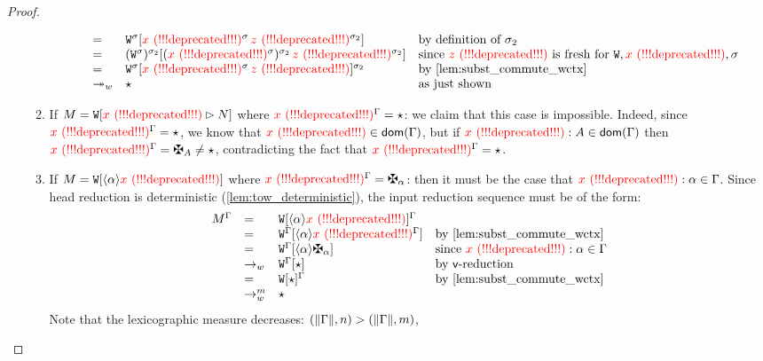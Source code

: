 \begin{proof}
\begin{enumerate}
\begin{enumerate}
\[\begin{array}{rlll}
      & = &
        \ctxof{\subs{\wctx}{\subst}}{\subs{\var}{\subst}\,\subs{\varthree}{\subst_2}}
        & \text{by definition of $\subst_2$}
      \\
      & = &
        \ctxof{\subs{(\subs{\wctx}{\subst})}{\subst_2}}{\subs{(\subs{\var}{\subst})}{\subst_2}\,\subs{\varthree}{\subst_2}}
        & \text{since $\varthree$ is fresh for $\wctx,\var,\subst$}
      \\
      & = &
        \subs{\ctxof{\subs{\wctx}{\subst}}{\subs{\var}{\subst}\,\varthree}}{\subst_2}
        & \text{by \cref{lem:subst_commute_wctx}}
      \\
      & \tows &
        \iunit
        & \text{as just shown}
      \end{array}
    \]
  \item
    If $M = \mathtt{W}[\textcolor{red}{x \text{\,\,(!!!deprecated!!!)}}\rhd N]$
    where $\textcolor{red}{x \text{\,\,(!!!deprecated!!!)}}^{\Gamma} = \star$:
    we claim that this case is impossible. 
    Indeed, since $\textcolor{red}{x \text{\,\,(!!!deprecated!!!)}}^{\Gamma} = \star$,
    we know that $\textcolor{red}{x \text{\,\,(!!!deprecated!!!)}} \in \mathsf{dom}(\Gamma)$,
    but if $\textcolor{red}{x \text{\,\,(!!!deprecated!!!)}} : A \in \mathsf{dom}(\Gamma)$
    then $\subs{\var}{\tenv} = \gen{\typ} \neq \iunit$,
    contradicting the fact that $\textcolor{red}{x \text{\,\,(!!!deprecated!!!)}}^{\Gamma} = \star$.
  \item
    If $M = \mathtt{W}[\langle\alpha\rangle\textcolor{red}{x \text{\,\,(!!!deprecated!!!)}}]$
    where $\subs{\var}{\tenv} = \genbtyp$:
    then it must be the case that $\textcolor{red}{x \text{\,\,(!!!deprecated!!!)}} : \alpha \in \Gamma$.
    Since head reduction is deterministic (\cref{lem:tow_deterministic}),
    the input reduction sequence must be of the form:
    \[
      \begin{array}{rlll}
        \subs{\utm}{\tenv}
      & = &
        \subs{\ctxof{\wctx}{\verifbtyp{\var}}}{\tenv}
      \\
      & = &
        \ctxof{\subs{\wctx}{\tenv}}{\verifbtyp{\subs{\var}{\tenv}}}
        & \text{by \cref{lem:subst_commute_wctx}}
      \\
      & = &
        \ctxof{\subs{\wctx}{\tenv}}{\verifbtyp{\genbtyp}}
        & \text{since $\var : \btyp \in \tenv$}
      \\
      & \tow &
        \ctxof{\subs{\wctx}{\tenv}}{\iunit}
        & \text{by $\symVerifGen$-reduction}
      \\
      & = &
        \subs{\ctxof{\wctx}{\iunit}}{\tenv}
        & \text{by \cref{lem:subst_commute_wctx}}
      \\
      & \tow^m &
        \iunit
      \end{array}
    \]
    Note that the lexicographic measure decreases:
    $(\lVert\Gamma\rVert,n) > (\lVert\Gamma\rVert,m)$,

\end{enumerate}
\end{enumerate}
\end{proof}
